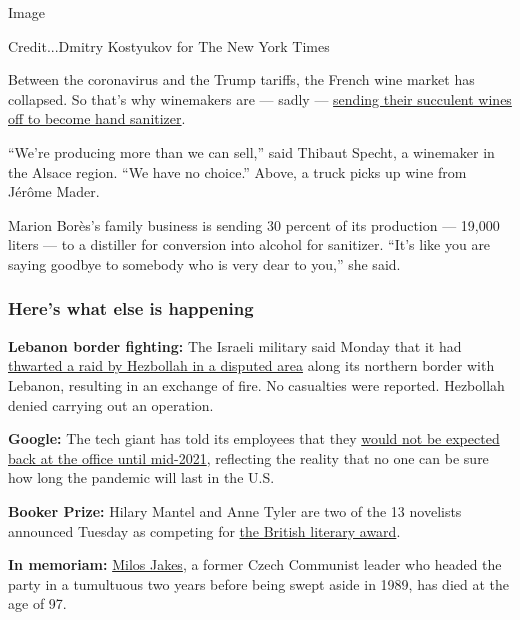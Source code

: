 Image

Credit...Dmitry Kostyukov for The New York Times

Between the coronavirus and the Trump tariffs, the French wine market
has collapsed. So that's why winemakers are --- sadly ---
\href{https://www.nytimes.com/2020/07/27/world/europe/france-alsace-wine-coronavirus.html}{sending
their succulent wines off to become hand sanitizer}.

``We're producing more than we can sell,'' said Thibaut Specht, a
winemaker in the Alsace region. ``We have no choice.'' Above, a truck
picks up wine from Jérôme Mader.

Marion Borès's family business is sending 30 percent of its production
--- 19,000 liters --- to a distiller for conversion into alcohol for
sanitizer. ``It's like you are saying goodbye to somebody who is very
dear to you,'' she said.

\hypertarget{heres-what-else-is-happening}{%
\subsubsection{Here's what else is
happening}\label{heres-what-else-is-happening}}

\textbf{Lebanon border fighting:} The Israeli military said Monday that
it had
\href{https://www.nytimes.com/2020/07/27/world/middleeast/israel-hezbollah-lebanon-fighting.html}{thwarted
a raid by Hezbollah in a disputed area} along its northern border with
Lebanon, resulting in an exchange of fire. No casualties were reported.
Hezbollah denied carrying out an operation.

\textbf{Google:} The tech giant has told its employees that they
\href{https://www.nytimes.com/live/2020/07/27/business/stock-market-today-coronavirus\#google-will-let-employees-work-from-home-until-july-2021}{would
not be expected back at the office until mid-2021}, reflecting the
reality that no one can be sure how long the pandemic will last in the
U.S.

\textbf{Booker Prize:} Hilary Mantel and Anne Tyler are two of the 13
novelists announced Tuesday as competing for
\href{https://www.nytimes.com/2020/07/27/books/hilary-mantel-booker-prize-longlist.html}{the
British literary award}.

\textbf{In memoriam:}
\href{https://www.nytimes.com/2020/07/25/world/europe/milos-jakes-dead.html}{Milos
Jakes}, a former Czech Communist leader who headed the party in a
tumultuous two years before being swept aside in 1989, has died at the
age of 97.

